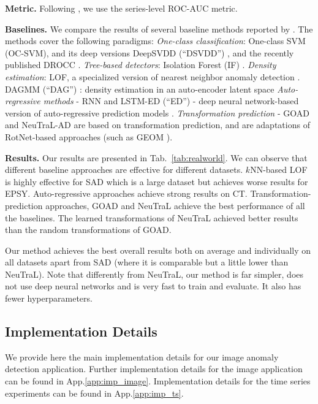 \documentclass{article}
\begin{document}
\textbf{Metric.} Following \citet{qiu2021neural}, we use the series-level ROC-AUC metric.

\textbf{Baselines.} We compare the results of several baseline methods reported by \citet{qiu2021neural}. The methods cover the following paradigms: \textit{One-class classification}: One-class SVM (OC-SVM), and its deep versions DeepSVDD  (``DSVDD'') \cite{ruff2018deep}, and the recently published DROCC \cite{goyal2020drocc}. 
\textit{Tree-based detectors}: Isolation Forest (IF) \cite{liu2008isolation}. \textit{Density estimation}: LOF, a specialized version of nearest neighbor anomaly detection \cite{breunig2000lof}.  DAGMM (``DAG'') \cite{zong2018deep}: density estimation in an auto-encoder latent space \textit{Auto-regressive methods} - RNN and LSTM-ED (``ED'') - deep neural network-based version of auto-regressive prediction models \cite{malhotra2016lstm}. \textit{Transformation prediction} - GOAD \cite{bergman2020classification} and NeuTraL-AD \cite{qiu2021neural} are based on transformation prediction, and are adaptations of RotNet-based approaches (such as GEOM \cite{golan2018deep}). 



\textbf{Results.} Our results are presented in Tab.~\ref{tab:realworld}. We can observe that different baseline approaches are effective for different datasets. $k$NN-based LOF is highly effective for SAD which is a large dataset but achieves worse results for EPSY. Auto-regressive approaches achieve strong results on CT. Transformation-prediction approaches, GOAD and NeuTraL achieve the best performance of all the baselines. The learned transformations of NeuTraL achieved better results than the random transformations of GOAD.

Our method achieves the best overall results both on average and individually on all datasets apart from SAD (where it is comparable but a little lower than NeuTraL). Note that differently from NeuTraL, our method is far simpler, does not use deep neural networks and is very fast to train and evaluate. It also has fewer hyperparameters.


\subsection{Implementation Details} 
\label{sec:implementation_details}

We provide here the main implementation details for our image anomaly detection application.
Further implementation details for the image application can be found in
App.\ref{app:imp_image}. Implementation details for the time series experiments can be found in App.\ref{app:imp_ts}.
\end{document}
